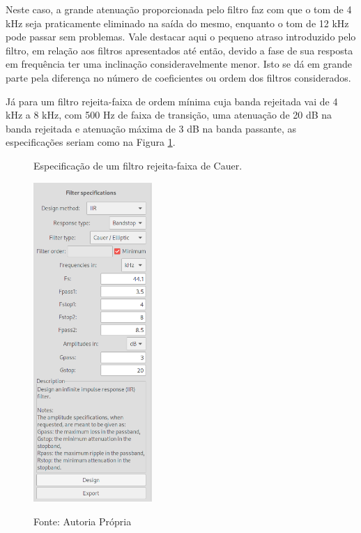\documentclass[12pt,a4paper]{report}
\begin{document}
  Neste caso, a grande atenuação proporcionada pelo filtro faz com que o tom de 4 kHz seja praticamente eliminado
  na saída do mesmo, enquanto o tom de 12 kHz pode passar sem problemas. Vale destacar aqui o pequeno atraso
  introduzido pelo filtro, em relação aos filtros apresentados até então, devido a fase de sua resposta em
  frequência ter uma inclinação consideravelmente menor. Isto se dá em grande parte pela diferença no número
  de coeficientes ou ordem dos filtros considerados.

  Já para um filtro rejeita-faixa de ordem mínima cuja banda rejeitada vai de 4 kHz a 8 kHz, com 500 Hz de faixa
  de transição, uma atenuação de 20 dB na banda rejeitada e atenuação máxima de 3 dB na banda passante, as
  especificações seriam como na Figura \ref{fig:cauer_specifications}.
  \begin{figure}[H]
    \caption{Especificação de um filtro rejeita-faixa de Cauer.}
    \centering
    \includegraphics[width=0.4\textwidth]{images/cauer_specifications}
    \label{fig:cauer_specifications}
    \caption*{Fonte: Autoria Própria}
  \end{figure}
\end{document}
